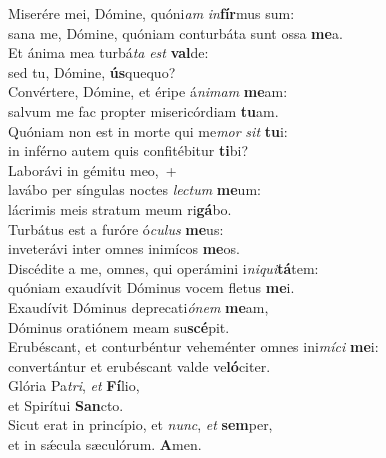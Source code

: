 \evenverse Miserére mei, Dómine, quóni\textit{am} \textit{in}\textbf{fír}mus sum:~\*\\
\evenverse sana me, Dómine, quóniam conturbáta sunt ossa \textbf{me}a.\\
\oddverse Et ánima mea turbá\textit{ta} \textit{est} \textbf{val}de:~\*\\
\oddverse sed tu, Dómine, \textbf{ús}quequo?\\
\evenverse Convértere, Dómine, et éripe á\textit{ni}\textit{mam} \textbf{me}am:~\*\\
\evenverse salvum me fac propter misericórdiam \textbf{tu}am.\\
\oddverse Quóniam non est in morte qui me\textit{mor} \textit{sit} \textbf{tu}i:~\*\\
\oddverse in inférno autem quis confitébitur \textbf{ti}bi?\\
\evenverse Laborávi in gémitu meo,~+\\
\evenverse  lavábo per síngulas noctes \textit{le}\textit{ctum} \textbf{me}um:~\*\\
\evenverse lácrimis meis stratum meum ri\textbf{gá}bo.\\
\oddverse Turbátus est a furóre ó\textit{cu}\textit{lus} \textbf{me}us:~\*\\
\oddverse inveterávi inter omnes inimícos \textbf{me}os.\\
\evenverse Discédite a me, omnes, qui operámini i\textit{ni}\textit{qui}\textbf{tá}tem:~\*\\
\evenverse quóniam exaudívit Dóminus vocem fletus \textbf{me}i.\\
\oddverse Exaudívit Dóminus deprecati\textit{ó}\textit{nem} \textbf{me}am,~\*\\
\oddverse Dóminus oratiónem meam su\textbf{scé}pit.\\
\evenverse Erubéscant, et conturbéntur veheménter omnes ini\textit{mí}\textit{ci} \textbf{me}i:~\*\\
\evenverse convertántur et erubéscant valde ve\textbf{ló}citer.\\
\oddverse Glória Pa\textit{tri}, \textit{et} \textbf{Fí}lio,~\*\\
\oddverse et Spirítui \textbf{San}cto.\\
\evenverse Sicut erat in princípio, et \textit{nunc}, \textit{et} \textbf{sem}per,~\*\\
\evenverse et in sǽcula sæculórum. \textbf{A}men.\\

